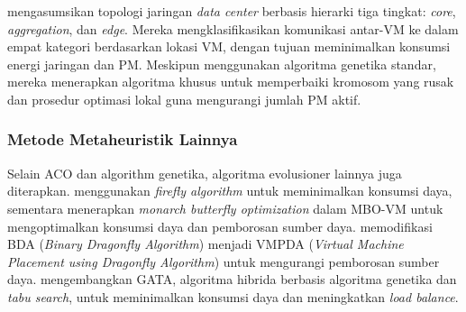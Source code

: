 \citet{TangPan2014} mengasumsikan topologi jaringan \textit{data center} berbasis hierarki tiga tingkat: \textit{core}, \textit{aggregation}, dan \textit{edge}. Mereka mengklasifikasikan komunikasi antar-VM ke dalam empat kategori berdasarkan lokasi VM, dengan tujuan meminimalkan konsumsi energi jaringan dan PM. Meskipun menggunakan algoritma genetika standar, mereka menerapkan algoritma khusus untuk memperbaiki kromosom yang rusak dan prosedur optimasi lokal guna mengurangi jumlah PM aktif.

\subsubsection{Metode Metaheuristik Lainnya}
Selain ACO dan algorithm genetika, algoritma evolusioner lainnya juga diterapkan. \citet{BalajiKiranKumar2023} menggunakan \textit{firefly algorithm} untuk meminimalkan konsumsi daya, sementara \citet{Ghetas2021} menerapkan \textit{monarch butterfly optimization} dalam MBO-VM untuk mengoptimalkan konsumsi daya dan pemborosan sumber daya. \citet{TripathiPathakVidyarthi2020} memodifikasi BDA (\textit{Binary Dragonfly Algorithm}) menjadi VMPDA (\textit{Virtual Machine Placement using Dragonfly Algorithm}) untuk mengurangi pemborosan sumber daya. \citet{ZhaoZhouLi2019} mengembangkan GATA, algoritma hibrida berbasis algoritma genetika dan \textit{tabu search}, untuk meminimalkan konsumsi daya dan meningkatkan \textit{load balance}.


